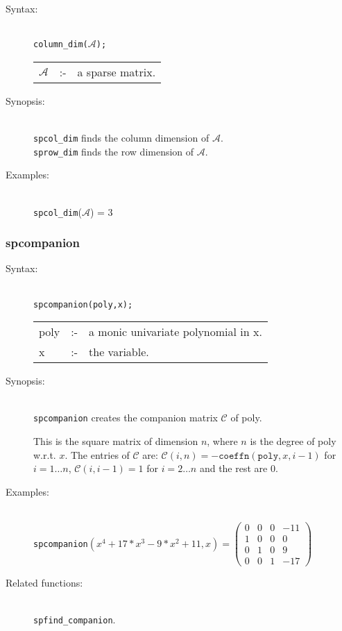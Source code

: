 \begin{description}
\item[Syntax:]\mbox{}\\
\texttt{column\_dim($\mathcal{A}$);}\\[2mm]
\begin{tabular}{l l l}
$\mathcal{A}$ &:-& a sparse matrix.
\end{tabular}

\item[Synopsis:]\mbox{}\\
\texttt{spcol\_dim} finds the column dimension of
                $\mathcal{A}$. \\
\texttt{sprow\_dim} finds the row dimension of $\mathcal{A}$.

\item[Examples:]\mbox{}\\
\texttt{spcol\_dim}($\mathcal{A}$) = 3
\end{description}

\subsubsection{spcompanion}
\label{sparse:spcompanion}
\hypertarget{operator:SPCOMPANION}{}

\begin{description}
\item[Syntax:]\mbox{}\\
\texttt{spcompanion(poly,x);}\\[2mm]
\begin{tabular}{l l l}
poly &:-& a monic univariate polynomial in x. \\
x    &:-& the variable.
\end{tabular}

\item[Synopsis:]\mbox{}\\
                \texttt{spcompanion} creates the companion matrix $\mathcal{C}$
                of poly.

This is the square matrix of dimension $n$, where $n$ is the degree of poly
w.r.t. $x$.
The entries of $\mathcal{C}$ are:
                $\mathcal{C}(i,n) = -\texttt{coeffn}(\texttt{poly},x,i-1)$ for $i = 1
                \ldots n$, $\mathcal{C}(i,i-1) = 1$ for $i = 2 \ldots n$ and
                the rest are $0$.

\item[Examples:]\mbox{}\\
\texttt{spcompanion}\((x^4+17*x^3-9*x^2+11,x) =
\begin{pmatrix}
  0 & 0 & 0 & -11 \\ 1 & 0 & 0 & 0 \\ 0 & 1 & 0 & 9 \\ 0 & 0 & 1 & -17
\end{pmatrix}
\)

\item[Related functions:]\mbox{}\\
\texttt{spfind\_companion}.
\end{description}

